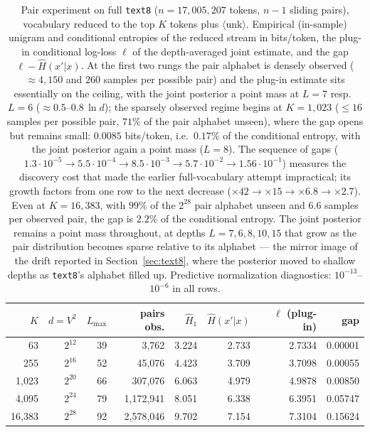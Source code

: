 \documentclass[11pt]{article}
\begin{document}
\begin{table}[ht]
\centering
\begin{tabular}{rrrrrrrr}
\toprule
$K$ & $d=V^2$ & $L_{\max}$ & pairs obs. & $\hat H_1$ & $\hat H(x'|x)$ & $\ell$ (plug-in) & gap \\
\midrule
    63 & $2^{12}$ & 39 &      3{,}762 & 3.224 & 2.733 & 2.7334 & 0.00001 \\
   255 & $2^{16}$ & 52 &     45{,}076 & 4.423 & 3.709 & 3.7098 & 0.00055 \\
 1{,}023 & $2^{20}$ & 66 &    307{,}076 & 6.063 & 4.979 & 4.9878 & 0.00850 \\
 4{,}095 & $2^{24}$ & 79 & 1{,}172{,}941 & 8.051 & 6.338 & 6.3951 & 0.05747 \\
16{,}383 & $2^{28}$ & 92 & 2{,}578{,}046 & 9.702 & 7.154 & 7.3104 & 0.15624 \\
\bottomrule
\end{tabular}
\caption{Pair experiment on full \texttt{text8} ($n = 17{,}005{,}207$
  tokens, $n-1$ sliding pairs), vocabulary reduced to the top $K$ tokens
  plus $\langle\mathrm{unk}\rangle$.  Empirical (in-sample) unigram and
  conditional entropies of the reduced stream in bits/token, the plug-in
  conditional log-loss $\ell$ of the depth-averaged joint estimate, and
  the gap $\ell-\hat H(x'|x)$.  At the first two rungs the pair alphabet
  is densely observed ($\approx 4{,}150$ and $260$ samples per possible
  pair) and the plug-in estimate sits essentially on the ceiling, with the
  joint posterior a point mass at $L=7$ resp.\ $L=6$
  ($\approx 0.5$--$0.8\,\ln d$); the sparsely observed regime begins at
  $K = 1{,}023$ ($\le 16$ samples per possible pair, $71\%$ of the pair
  alphabet unseen), where the gap opens but remains small:
  $0.0085$ bits/token, i.e.\ $0.17\%$ of the conditional entropy, with
  the joint posterior again a point mass ($L=8$).  The sequence of gaps
  ($1.3\cdot10^{-5} \to 5.5\cdot10^{-4} \to 8.5\cdot10^{-3} \to
  5.7\cdot10^{-2} \to 1.56\cdot10^{-1}$) measures the discovery cost that
  made the earlier full-vocabulary attempt impractical; its growth
  factors from one row to the next decrease ($\times 42 \to \times 15
  \to \times 6.8 \to \times 2.7$).  Even at $K=16{,}383$, with $99\%$ of
  the $2^{28}$ pair alphabet unseen and $6.6$ samples per observed pair,
  the gap is $2.2\%$ of the conditional entropy.  The joint posterior
  remains a point mass throughout, at depths $L = 7, 6, 8, 10, 15$ that
  grow as the pair distribution becomes sparse relative to its alphabet
  --- the mirror image of the drift reported in
  Section~\ref{sec:text8}, where the posterior moved to shallow depths
  as \texttt{text8}'s alphabet filled up.  Predictive normalization
  diagnostics: $10^{-13}$--$10^{-6}$ in all rows.}
\label{tab:pairs}
\end{table}
\end{document}
